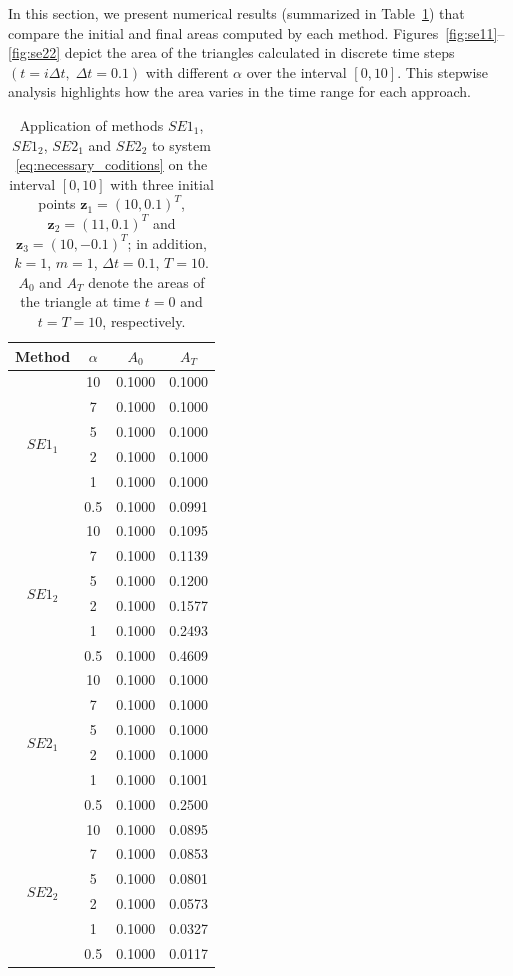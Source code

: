 \documentclass[a4paper, 10pt]{article}
\newcommand{\SEoo}{SE1_1}
\newcommand{\SEot}{SE1_2}
\newcommand{\SEto}{SE2_1}
\newcommand{\SEtt}{SE2_2}
\begin{document}
In this section, we present numerical results (summarized in Table~\ref{tab:area-linear}) that compare the initial and final areas computed by each method. Figures~\ref{fig:se11}--\ref{fig:se22} depict the area of the triangles calculated in discrete time steps $(t = i\Delta{t},\; \Delta{t} = 0.1)$ with different $\alpha$ over the interval $[0, 10]$. This stepwise analysis highlights how the area varies in the time range for each approach.

\begin{table}[ht!]
\centering
\begin{tabular}{|c|c|c|c|}
   \hline
Method & $\alpha$ & $A_0$ & $A_T$ \\
   \hline
   \multirow{6}{3em}{$\SEoo$}
   & 10  & 0.1000  & 0.1000 \\
   & 7   & 0.1000  & 0.1000 \\
   & 5   & 0.1000  & 0.1000 \\
   & 2   & 0.1000  & 0.1000 \\
   & 1   & 0.1000  & 0.1000 \\
   & 0.5 & 0.1000  & 0.0991 \\
   \hline
   \multirow{6}{3em}{$\SEot$}
   & 10  & 0.1000  & 0.1095 \\
   & 7   & 0.1000  & 0.1139 \\
   & 5   & 0.1000  & 0.1200 \\
   & 2   & 0.1000  & 0.1577 \\
   & 1   & 0.1000  & 0.2493 \\
   & 0.5 & 0.1000  & 0.4609 \\
   \hline
   \multirow{6}{3em}{$\SEto$}
   & 10  & 0.1000  & 0.1000 \\
   & 7   & 0.1000  & 0.1000 \\
   & 5   & 0.1000  & 0.1000 \\
   & 2   & 0.1000  & 0.1000 \\
   & 1   & 0.1000  & 0.1001 \\
   & 0.5 & 0.1000  & 0.2500 \\
   \hline
   \multirow{6}{3em}{$\SEtt$}
   & 10  & 0.1000  & 0.0895 \\
   & 7   & 0.1000  & 0.0853 \\
   & 5   & 0.1000  & 0.0801 \\
   & 2   & 0.1000  & 0.0573 \\
   & 1   & 0.1000  & 0.0327 \\
   & 0.5 & 0.1000  & 0.0117 \\
   \hline
\end{tabular}
\caption{Application of methods $\SEoo$, $\SEot$, $\SEto$ and $\SEtt$ to system \eqref{eq:necessary_coditions} on the interval $[0,10]$ with three initial points $\mathbf{z}_1 = (10,0.1)^{T}$, $\mathbf{z}_2 =(11,0.1)^{T}$ and $\mathbf{z}_3 = (10,-0.1)^{T}$; in addition, $k =1$, $m =1$, $\Delta t =0.1$, $T = 10$. $A_0$ and $A_T$ denote the areas of the triangle at time $t = 0$ and $t = T = 10$, respectively.}
\label{tab:area-linear}
\end{table}
\end{document}
